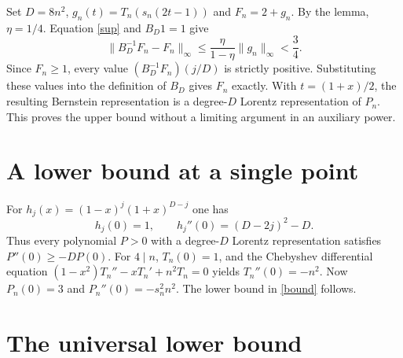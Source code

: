 \documentclass[11pt]{article}
\newcommand{\norm}[1]{\lVert #1\rVert_\infty}
\begin{document}
Set $D=8n^2$, $g_n(t)=T_n(s_n(2t-1))$ and $F_n=2+g_n$. By the lemma, $\eta=1/4$. Equation \eqref{sup} and $B_D1=1$ give
\[
 \norm{B_D^{-1}F_n-F_n}\le\frac{\eta}{1-\eta}\norm{g_n}<\frac34 .
\]
Since $F_n\ge1$, every value $(B_D^{-1}F_n)(j/D)$ is strictly positive. Substituting these values into the definition of $B_D$ gives $F_n$ exactly. With $t=(1+x)/2$, the resulting Bernstein representation is a degree-$D$ Lorentz representation of $P_n$. This proves the upper bound without a limiting argument in an auxiliary power.

\section{A lower bound at a single point}
For $h_j(x)=(1-x)^j(1+x)^{D-j}$ one has
\[
          h_j(0)=1,\qquad h_j''(0)=(D-2j)^2-D.
\]
Thus every polynomial $P>0$ with a degree-$D$ Lorentz representation satisfies
$P''(0)\ge-DP(0)$. For $4\mid n$, $T_n(0)=1$, and the Chebyshev differential equation
$(1-x^2)T_n''-xT_n'+n^2 T_n=0$ yields $T_n''(0)=-n^2$.
Now $P_n(0)=3$ and $P_n''(0)=-s_n^2n^2$. The lower bound in \eqref{bound} follows.

\section{The universal lower bound}
\end{document}
